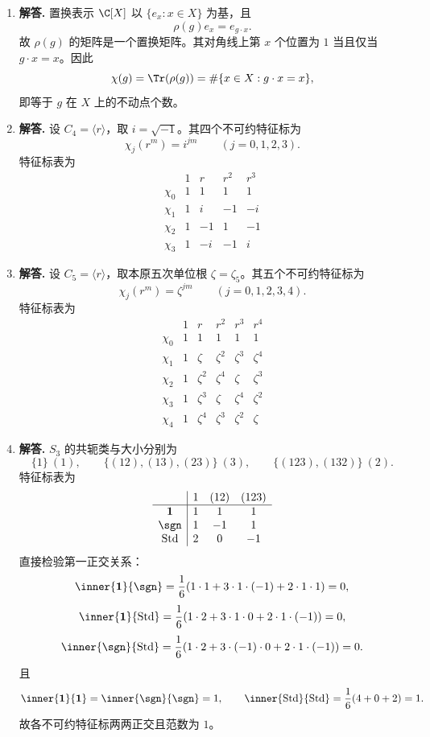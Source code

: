 \begin{enumerate}[label=\textbf{\arabic*.}, leftmargin=*, itemsep=1em]
\item \textbf{解答.} 置换表示 $\C[X]$ 以 $\{e_x:x\in X\}$ 为基，且
\[
\rho(g)e_x=e_{g\cdot x}.
\]
故 $\rho(g)$ 的矩阵是一个置换矩阵。其对角线上第 $x$ 个位置为 $1$ 当且仅当 $g\cdot x=x$。因此
\[
\chi(g)=\Tr(\rho(g))=\#\{x\in X:g\cdot x=x\},
\]
即等于 $g$ 在 $X$ 上的不动点个数。

\item \textbf{解答.} 设 $C_4=\langle r\rangle$，取 $i=\sqrt{-1}$。其四个不可约特征标为
\[
\chi_j(r^m)=i^{jm}\qquad (j=0,1,2,3).
\]
特征标表为
\[
\begin{array}{c|cccc}
 & 1 & r & r^2 & r^3\\
\hline
\chi_0 & 1 & 1 & 1 & 1\\
\chi_1 & 1 & i & -1 & -i\\
\chi_2 & 1 & -1 & 1 & -1\\
\chi_3 & 1 & -i & -1 & i
\end{array}
\]

\item \textbf{解答.} 设 $C_5=\langle r\rangle$，取本原五次单位根 $\zeta=\zeta_5$。其五个不可约特征标为
\[
\chi_j(r^m)=\zeta^{jm}\qquad (j=0,1,2,3,4).
\]
特征标表为
\[
\begin{array}{c|ccccc}
 & 1 & r & r^2 & r^3 & r^4\\
\hline
\chi_0 & 1 & 1 & 1 & 1 & 1\\
\chi_1 & 1 & \zeta & \zeta^2 & \zeta^3 & \zeta^4\\
\chi_2 & 1 & \zeta^2 & \zeta^4 & \zeta & \zeta^3\\
\chi_3 & 1 & \zeta^3 & \zeta & \zeta^4 & \zeta^2\\
\chi_4 & 1 & \zeta^4 & \zeta^3 & \zeta^2 & \zeta
\end{array}
\]

\item \textbf{解答.} $S_3$ 的共轭类与大小分别为
\[
\{1\}\ (1),\qquad \{(12),(13),(23)\}\ (3),\qquad \{(123),(132)\}\ (2).
\]
特征标表为
\[
\begin{array}{c|ccc}
 & 1 & (12) & (123)\\
\hline
\mathbf{1} & 1 & 1 & 1\\
\sgn & 1 & -1 & 1\\
\mathrm{Std} & 2 & 0 & -1
\end{array}
\]
直接检验第一正交关系：
\[
\inner{\mathbf{1}}{\sgn}
=\frac16(1\cdot1+3\cdot1\cdot(-1)+2\cdot1\cdot1)=0,
\]
\[
\inner{\mathbf{1}}{\mathrm{Std}}
=\frac16(1\cdot2+3\cdot1\cdot0+2\cdot1\cdot(-1))=0,
\]
\[
\inner{\sgn}{\mathrm{Std}}
=\frac16(1\cdot2+3\cdot(-1)\cdot0+2\cdot1\cdot(-1))=0.
\]
且
\[
\inner{\mathbf{1}}{\mathbf{1}}=\inner{\sgn}{\sgn}=1,\qquad
\inner{\mathrm{Std}}{\mathrm{Std}}=\frac16(4+0+2)=1.
\]
故各不可约特征标两两正交且范数为 $1$。


\end{enumerate}
